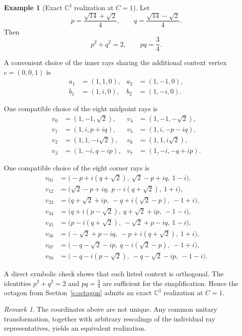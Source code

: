 \documentclass[
  twocolumn,
  aps,
  pra,
  floatfix,
  amsmath,amssymb,
  longbibliography
]{revtex4-2}
\theoremstyle{definition}
\newtheorem{example}[theorem]{Example}
\theoremstyle{remark}
\newtheorem{remark}[theorem]{Remark}
\begin{document}
\begin{example}[Exact \(\mathbb C^3\) realization at \(C=1\)]
\label{ex:C1}
Let
\[
  p=\frac{\sqrt{14}+\sqrt{2}}{4},
  \qquad
  q=\frac{\sqrt{14}-\sqrt{2}}{4}.
\]
Then
\[
  p^2+q^2=2,
  \qquad
  pq=\frac34.
\]

A convenient choice of the inner rays sharing the additional context
vertex $c=(0,0,1)$ is
\[
\begin{aligned}
  a_1 & =  (1,1,0), & a_2 & =  (1,-1,0),\\
  b_1 & =  (1,i,0), & b_2 & =  (1,-i,0).
\end{aligned}
\]

One compatible choice of the eight midpoint rays is
\[
\begin{aligned}
  v_0 & =  (1,-1,\sqrt2),       & v_4 & =  (1,-1,-\sqrt2),\\
  v_1 & =  (1,i,p+iq),          & v_5 & =  (1,i,-p-iq),\\
  v_2 & =  (1,1,-i\sqrt2),      & v_6 & =  (1,1,i\sqrt2),\\
  v_3 & =  (1,-i,q-ip),         & v_7 & =  (1,-i,-q+ip).
\end{aligned}
\]

One compatible choice of the eight corner rays is
\[
\begin{aligned}
  v_{01} & =  \bigl(-p+i(q+\sqrt2),\ \sqrt2-p+iq,\ 1-i\bigr),\\
  v_{12} & =  \bigl(\sqrt2-p+iq,\ p-i(q+\sqrt2),\ 1+i\bigr),\\
  v_{23} & =  \bigl(q+\sqrt2+ip,\ -q+i(\sqrt2-p),\ -1+i\bigr),\\
  v_{34} & =  \bigl(q+i(p-\sqrt2),\ q+\sqrt2+ip,\ -1-i\bigr),\\
  v_{45} & =  \bigl(p-i(q+\sqrt2),\ -\sqrt2+p-iq,\ 1-i\bigr),\\
  v_{56} & =  \bigl(-\sqrt2+p-iq,\ -p+i(q+\sqrt2),\ 1+i\bigr),\\
  v_{67} & =  \bigl(-q-\sqrt2-ip,\ q-i(\sqrt2-p),\ -1+i\bigr),\\
  v_{70} & =  \bigl(-q-i(p-\sqrt2),\ -q-\sqrt2-ip,\ -1-i\bigr).
\end{aligned}
\]

A direct symbolic check shows that each listed context is orthogonal.
The identities \(p^2+q^2=2\) and \(pq=\tfrac34\) are sufficient for
the simplification.  Hence the octagon from Section~\ref{s:octagon}
admits an exact \(\mathbb C^3\) realization at \(C=1\).
\end{example}

\begin{remark}
The coordinates above are not unique.  Any common unitary
transformation, together with arbitrary rescalings of the individual
ray representatives, yields an equivalent realization.
\end{remark}
\end{document}
